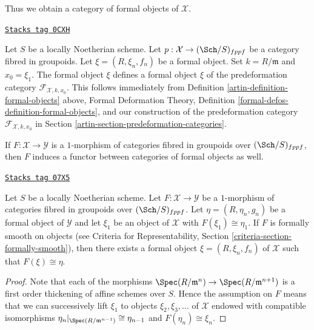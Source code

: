 Thus we obtain a category of formal objects of $\mathcal{X}$.

\begin{remark}
\label{artin-remark-formal-objects-match}
\href{https://stacks.math.columbia.edu/tag/0CXH}{\texttt{Stacks tag 0CXH}}

Let $S$ be a locally Noetherian scheme. Let
$p : \mathcal{X} \to (\Sch/S)_{fppf}$ be a category fibred in groupoids.
Let $\xi = (R, \xi_n, f_n)$ be a formal object. Set $k = R/\mathfrak m$ and
$x_0 = \xi_1$. The formal object $\xi$ defines a formal object
$\xi$ of the predeformation category $\mathcal{F}_{\mathcal{X}, k, x_0}$.
This follows immediately from
Definition \ref{artin-definition-formal-objects} above,
Formal Deformation Theory, Definition
\ref{formal-defos-definition-formal-objects},
and our construction of the predeformation category
$\mathcal{F}_{\mathcal{X}, k, x_0}$ in
Section \ref{artin-section-predeformation-categories}.
\end{remark}

If $F : \mathcal{X} \to \mathcal{Y}$ is a $1$-morphism of categories fibred
in groupoids over $(\Sch/S)_{fppf}$, then $F$ induces a functor between
categories of formal objects as well.

\begin{lemma}
\label{artin-lemma-smooth-lift-formal}
\href{https://stacks.math.columbia.edu/tag/07X5}{\texttt{Stacks tag 07X5}}

Let $S$ be a locally Noetherian scheme. Let $F : \mathcal{X} \to \mathcal{Y}$
be a $1$-morphism of categories fibred in groupoids over $(\Sch/S)_{fppf}$.
Let $\eta = (R, \eta_n, g_n)$ be a formal object of $\mathcal{Y}$
and let $\xi_1$ be an object of $\mathcal{X}$ with $F(\xi_1) \cong \eta_1$.
If $F$ is formally smooth on objects (see
Criteria for Representability, Section \ref{criteria-section-formally-smooth}),
then there exists a formal object $\xi = (R, \xi_n, f_n)$ of $\mathcal{X}$
such that $F(\xi) \cong \eta$.
\end{lemma}

\begin{proof}
Note that each of the morphisms
$\Spec(R/\mathfrak m^n) \to \Spec(R/\mathfrak m^{n + 1})$ is a first order
thickening of affine schemes over $S$. Hence the assumption on $F$ means
that we can successively lift $\xi_1$ to objects $\xi_2, \xi_3, \ldots$
of $\mathcal{X}$ endowed with compatible isomorphisms
$\eta_n|_{\Spec(R/\mathfrak m^{n - 1})} \cong \eta_{n - 1}$
and $F(\eta_n) \cong \xi_n$.
\end{proof}


